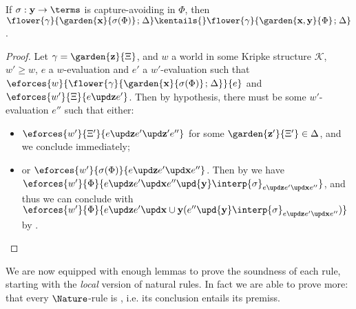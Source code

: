 \begin{lemma}
  
  If $\sigma : \by \to \terms$ is capture-avoiding in $\Phi$, then
  $\flower{\gamma}{\garden{\bx}{\sigma(\Phi)} \sep \Delta} \kentails{}
  \flower{\gamma}{\garden{\bx,\by}{\Phi} \sep \Delta}$.
\end{lemma}
\begin{proof}
  Let $\gamma = \garden{\bz}{\Xi}$, and $w$ a world in some Kripke
  structure $\mathcal{K}$, $w' \geq w$, $e$ a $w$-evaluation and $e'$ a
  $w'$-evaluation such that
  $\eforces{w}{\flower{\gamma}{\garden{\bx}{\sigma(\Phi)} \sep \Delta}}{e}$ and
  $\eforces{w'}{\Xi}{\update{e}{\bz}{e'}}$. Then by hypothesis, there must be
  some $w'$-evaluation $e''$ such that either:
  \begin{itemize}
    \item
    $\eforces{w'}{\Xi'}{\update{e}{\bz}{\update{e'}{\bz'}{e''}}}$ for some
    $\garden{\bz'}{\Xi'} \in \Delta$, and we conclude immediately;
    \item
    or $\eforces{w'}{\sigma(\Phi)}{\update{e}{\bz}{\update{e'}{\bx}{e''}}}$.
    Then by  we have
    $\eforces{w'}{\Phi}{\update{e}{\bz}{\update{e'}{\bx}{e'' \upd{\by}
    \interp{\sigma}_{\update{e}{\bz}{\update{e'}{\bx}{e''}}}}}}$, and thus we
    can conclude with $\eforces{w'}{\Phi}{\update{e}{\bz}{\update{e'}{\bx \cup
    \by}{(e'' \upd{\by}
    \interp{\sigma}_{\update{e}{\bz}{\update{e'}{\bx}{e''}}})}}}$ by
    .
  \end{itemize}
\end{proof}

We are now equipped with enough lemmas to prove the soundness of each rule,
starting with the \emph{local} version of natural rules. In fact we are able to
prove more: that every $\Nature$-rule is \emph{}, i.e. its conclusion
entails its premiss.

